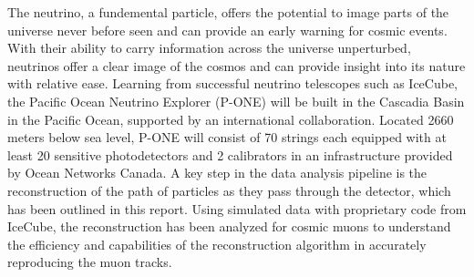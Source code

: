 The neutrino, a fundemental particle, offers the potential to image parts of the universe never before seen and can provide an early warning for cosmic events. With their ability to carry information across the universe unperturbed, neutrinos offer a clear image of the cosmos and can provide insight into its nature with relative ease. Learning from successful neutrino telescopes such as IceCube, the Pacific Ocean Neutrino Explorer (P-ONE) will be built in the Cascadia Basin in the Pacific Ocean, supported by an international collaboration. Located 2660 meters below sea level, P-ONE will consist of 70 strings each equipped with at least 20 sensitive photodetectors and 2 calibrators in an infrastructure provided by Ocean Networks Canada. A key step in the data analysis pipeline is the reconstruction of the path of particles as they pass through the detector, which has been outlined in this report. Using simulated data with proprietary code from IceCube, the reconstruction has been analyzed for cosmic muons to understand the efficiency and capabilities of the reconstruction algorithm in accurately reproducing the muon tracks. 
